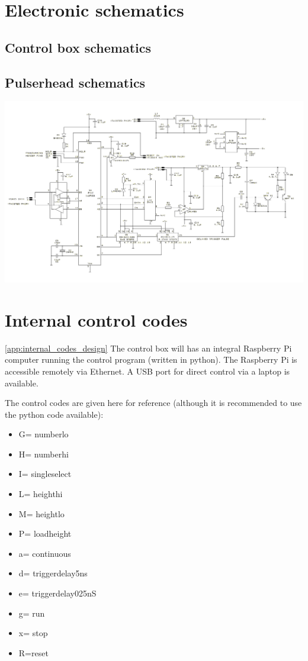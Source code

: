 
%
%
\section{Electronic schematics}
\subsection*{Control box schematics}
\subsection*{Pulserhead schematics}
\includegraphics[width=\linewidth]{figures/pulserhead_schematic.png}
%
%
\section{Internal control codes}
\ref{app:internal_codes_design}
The control box will has an integral Raspberry Pi computer running the control program (written in python). The Raspberry Pi is accessible remotely via Ethernet. A USB port for direct control via a laptop is available.

The control codes are given here for reference (although it is recommended to use the python code available):
\begin{itemize}
\item	G= numberlo		
\item H= numberhi
\item I= singleselect
\item L= heighthi
\item M= heightlo
\item P= loadheight
\item a= continuous
\item d= triggerdelay5ns
\item e= triggerdelay025nS
\item g= run
\item x= stop
\item R=reset
\end{itemize}


